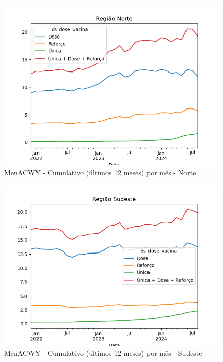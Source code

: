 \documentclass[12pt]{article}
\begin{document}
\begin{figure}[H]
    \centering
    \includegraphics[width=0.85\linewidth]{imagens/MenACWY-Norte-Cumulativo-mes}
    \caption{MenACWY - Cumulativo (últimos 12 meses) por mês - Norte}
    \label{fig:MenACWY-norte-cumulativo-mes}
\end{figure}
\begin{figure}[H]
    \centering
    \includegraphics[width=0.85\linewidth]{imagens/MenACWY-Sudeste-Cumulativo-mes}
    \caption{MenACWY - Cumulativo (últimos 12 meses) por mês - Sudeste}
    \label{fig:MenACWY-sudeste-cumulativo-mes}
\end{figure}
\end{document}
